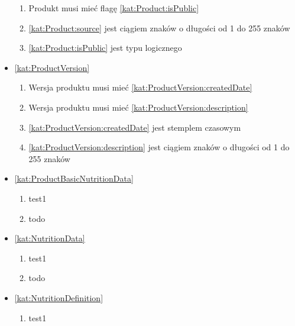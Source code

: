 \begin{itemize}[label={\textbf{Ograniczenia dla}}, wide, labelwidth=!, labelindent=0pt]
\begin{enumerate}[label={\textbf{OGR/\protect\threedigits{\arabic{enumi}}}}, wide, labelwidth=!, align=left, leftmargin=3cm, resume]
        \item Produkt musi mieć flagę \ref{kat:Product:isPublic}
        \item \ref{kat:Product:source} jest ciągiem znaków o długości od 1 do 255 znaków
        \item \ref{kat:Product:isPublic} jest typu logicznego
    \end{enumerate}
    \item\ref{kat:ProductVersion}
    \begin{enumerate}[label={\textbf{OGR/\protect\threedigits{\arabic{enumi}}}}, wide, labelwidth=!, align=left, leftmargin=3cm, resume]
        \item Wersja produktu musi mieć \ref{kat:ProductVersion:createdDate}
        \item Wersja produktu musi mieć \ref{kat:ProductVersion:description}
        \item \ref{kat:ProductVersion:createdDate} jest stemplem czasowym
        \item \ref{kat:ProductVersion:description} jest ciągiem znaków o długości od 1 do 255 znaków
    \end{enumerate}
    \item\ref{kat:ProductBasicNutritionData}
    \begin{enumerate}[label={\textbf{OGR/\protect\threedigits{\arabic{enumi}}}}, wide, labelwidth=!, align=left, leftmargin=3cm, resume]

        \item test1

        \item todo
    \end{enumerate}
    \item\ref{kat:NutritionData}
    \begin{enumerate}[label={\textbf{OGR/\protect\threedigits{\arabic{enumi}}}}, wide, labelwidth=!, align=left, leftmargin=3cm, resume]

        \item test1

        \item todo
    \end{enumerate}
    \item\ref{kat:NutritionDefinition}
    \begin{enumerate}[label={\textbf{OGR/\protect\threedigits{\arabic{enumi}}}}, wide, labelwidth=!, align=left, leftmargin=3cm, resume]

        \item test1


\end{enumerate}
\end{itemize}
